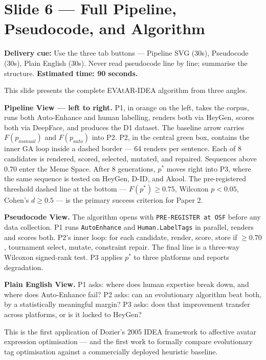 \documentclass[12pt,a4paper]{article}
\begin{document}
\newpage
\section{Slide 6 --- Full Pipeline, Pseudocode, and Algorithm}

\begin{cuebox}
\textbf{Delivery cue:} Use the three tab buttons --- Pipeline SVG (30s), Pseudocode (30s),
Plain English (30s). Never read pseudocode line by line; summarise the structure.
\textbf{Estimated time: 90 seconds.}
\end{cuebox}

\begin{speechbox}
This slide presents the complete EVAtAR-IDEA algorithm from three angles.

\textbf{Pipeline View --- left to right.}
P1, in orange on the left, takes the corpus, runs both Auto-Enhance and human labelling,
renders both via HeyGen, scores both via DeepFace, and produces the D1 dataset.
The baseline arrow carries $F(p_{manual})$ and $F(p_{auto})$ into P2.
P2, in the central green box, contains the inner GA loop inside a dashed border ---
64 renders per sentence. Each of 8 candidates is rendered, scored, selected, mutated, and
repaired. Sequences above 0.70 enter the Meme Space. After 8 generations, $p^*$ moves right
into P3, where the same sequence is tested on HeyGen, D-ID, and Akool.
The pre-registered threshold dashed line at the bottom ---
$F(p^*) \geq 0.75$, Wilcoxon $p < 0.05$, Cohen's $d \geq 0.5$ ---
is the primary success criterion for Paper 2.

\textbf{Pseudocode View.}
The algorithm opens with \texttt{PRE-REGISTER at OSF} before any data collection.
P1 runs \texttt{AutoEnhance} and \texttt{Human.LabelTags} in parallel, renders and scores both.
P2's inner loop: for each candidate, render, score, store if $\geq 0.70$, tournament select,
mutate, constraint repair. The final line is a three-way Wilcoxon signed-rank test.
P3 applies $p^*$ to three platforms and reports degradation.

\textbf{Plain English View.}
P1 asks: where does human expertise break down, and where does Auto-Enhance fail?
P2 asks: can an evolutionary algorithm beat both, by a statistically meaningful margin?
P3 asks: does that improvement transfer across platforms, or is it locked to HeyGen?

This is the first application of Dozier's 2005 IDEA framework to affective avatar expression
optimisation --- and the first work to formally compare evolutionary tag optimisation against
a commercially deployed heuristic baseline.
\end{speechbox}
\end{document}
